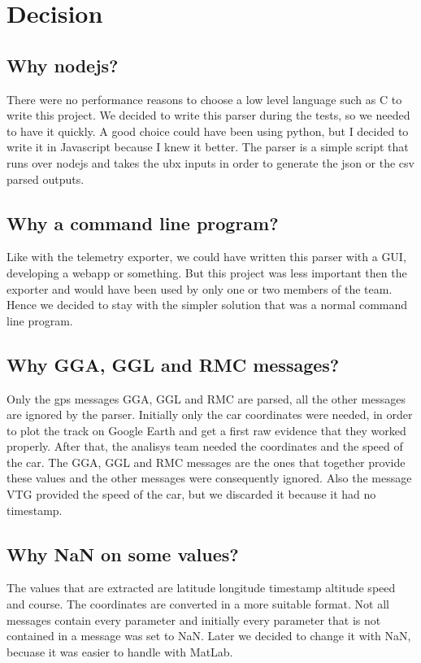 \section{\huge{Decision}}

\subsection{Why nodejs?}
There were no performance reasons to choose a low level language such as C to write this project. We decided to write this
parser during the tests, so we needed to have it quickly. A good choice could have been using python, but I decided to
write it in Javascript because I knew it better. The parser is a simple script that runs over nodejs and takes the ubx
inputs in order to generate the json or the csv parsed outputs.

\subsection{Why a command line program?}
Like with the telemetry exporter, we could have written this parser with a GUI, developing a webapp or something. 
But this project was less important then the exporter and would have been used by only one or two members of the team.
Hence we decided to stay with the simpler solution that was a normal command line program.

\subsection{Why GGA, GGL and RMC messages?}
Only the gps messages GGA, GGL and RMC are parsed, all the other messages are ignored by the parser. Initially only the 
car coordinates were needed, in order to plot the track on Google Earth and get a first raw evidence that they worked properly.
After that, the analisys team needed the coordinates and the speed of the car. The GGA, GGL and RMC messages are the 
ones that together provide these values and the other messages were consequently ignored. Also the message VTG provided
the speed of the car, but we discarded it because it had no timestamp.

\subsection{Why NaN on some values?}
The values that are extracted are latitude longitude timestamp altitude speed and course. The coordinates are converted in a more suitable format.
Not all messages contain every parameter and initially every parameter that is not contained in a message was set to NaN.
Later we decided to change it with NaN, becuase it was easier to handle with MatLab.